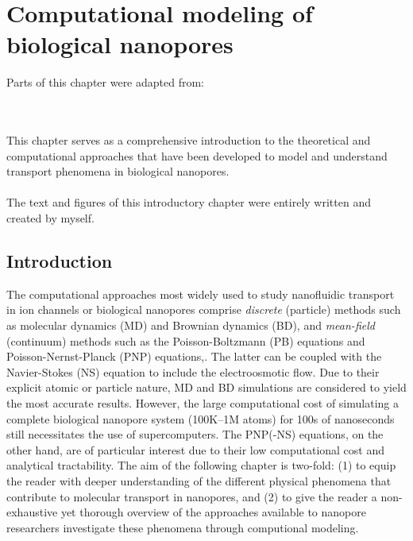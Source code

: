 \chapter{Computational modeling of biological nanopores}\label{ch:modelling}

\begin{shaded}
Parts of this chapter were adapted from:\\
\\
\\
\newpage
\end{shaded}

This chapter serves as a comprehensive introduction to the theoretical and computational approaches that have been developed to model and understand transport phenomena in biological nanopores. \\
\\
The text and figures of this introductory chapter were entirely written and created by myself.

\newpage

\section{Introduction}

The computational approaches most widely used to study nanofluidic transport in ion channels or biological
nanopores comprise \emph{discrete} (particle) methods such as molecular dynamics
(MD)\cite{Lynden-Bell-1996,Allen-1999,Aksimentiev-2005,Luan-2008,Bhattacharya-2011,Zhang-2014,DiMarino-2015,Belkin-2016}
and Brownian dynamics
(BD),\cite{Schirmer-1999,Im-2002,Noskov-2004,Millar-2008,Egwolf-2010,DeBiase-2015,Pederson-2015} and
\emph{mean-field} (continuum) methods such as the Poisson-Boltzmann (PB)
equations\cite{Grochowski-2008,Baldessari-2008-1} and Poisson-Nernst-Planck (PNP)
equations,\cite{Eisenberg-1996,Gillespie-2002,Simakov-2010}. The latter can be coupled with the Navier-Stokes
(NS) equation to include the electroosmotic flow.\cite{Lu-2012,Pederson-2015} Due to their explicit atomic or
particle nature, MD and BD simulations are considered to yield the most accurate results. However, the large
computational cost of simulating a complete biological nanopore system (100K--1M atoms) for 100s of
nanoseconds still necessitates the use of supercomputers.\cite{Aksimentiev-2005,Bhattacharya-2011} The
PNP(-NS) equations, on the other hand, are of particular interest due to their low computational cost and
analytical tractability. The aim of the following chapter is two-fold: (1) to equip the reader with deeper
understanding of the different physical phenomena that contribute to molecular transport in nanopores, and
(2) to give the reader a non-exhaustive yet thorough overview of the approaches available to nanopore
researchers investigate these phenomena through computional modeling.

